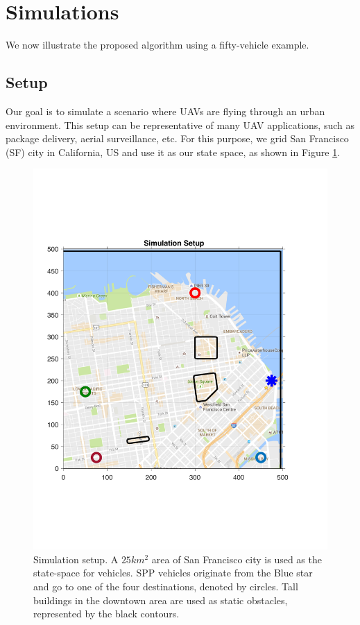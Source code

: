 \section{Simulations \label{sec:simulations}}
We now illustrate the proposed algorithm using a fifty-vehicle example. 

\subsection{Setup \label{sec:simSetup}}
Our goal is to simulate a scenario where UAVs are flying through an urban environment. This setup can be representative of many UAV applications, such as package delivery, aerial surveillance, etc. For this purpose, we grid San Francisco (SF) city in California, US and use it as our state space, as shown in Figure \ref{fig:sf_setup}. 
\begin{figure}[H]
  \centering
  \includegraphics[width=\columnwidth]{"figs/sf_setup"}
  \caption{Simulation setup. A $25 km^2$ area of San Francisco city is used as the state-space for vehicles. SPP vehicles originate from the Blue star and go to one of the four destinations, denoted by circles. Tall buildings in the downtown area are used as static obstacles, represented by the black contours.}
  \label{fig:sf_setup}
\end{figure}
